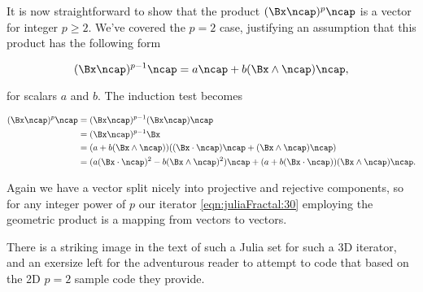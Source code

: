 It is now straightforward to show that the product $(\Bx \ncap)^p \ncap$ is a vector for integer $p \ge 2$.  We've covered the $p=2$ case, justifying an assumption that this product has the following form

\begin{equation}\label{eqn:juliaFractal:60}
(\Bx \ncap)^{p-1} \ncap = a \ncap + b (\Bx \wedge \ncap) \ncap,
\end{equation}

for scalars $a$ and $b$.  The induction test becomes

\begin{align*}
(\Bx \ncap)^{p} \ncap 
&= (\Bx \ncap)^{p-1} (\Bx \ncap) \ncap \\
&= (\Bx \ncap)^{p-1} \Bx \\
&= (a + b (\Bx \wedge \ncap) ) ((\Bx \cdot \ncap )\ncap + (\Bx \wedge \ncap) \ncap) \\
&= 
( a(\Bx \cdot \ncap )^2 - b (\Bx \wedge \ncap)^2 ) \ncap
+ ( a + b(\Bx \cdot \ncap ) ) (\Bx \wedge \ncap) \ncap.
\end{align*}

Again we have a vector split nicely into projective and rejective components, so for any integer power of $p$ our iterator \ref{eqn:juliaFractal:30} employing the geometric product is a mapping from vectors to vectors.

There is a striking image in the text of such a Julia set for such a 3D iterator, and an exersize left for the adventurous reader to attempt to code that based on the 2D $p=2$ sample code they provide.

\EndArticle
